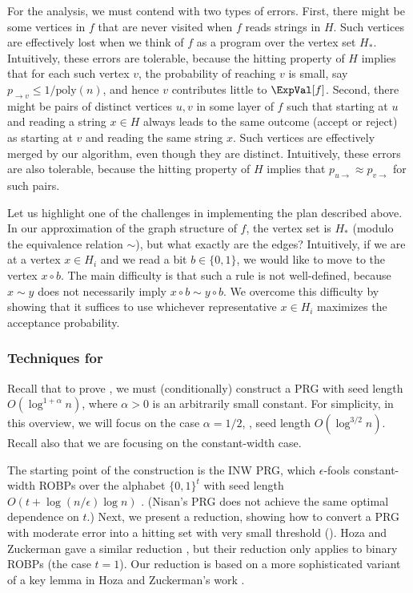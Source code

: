 For the analysis, we must contend with two types of errors. First, there might be some vertices in $f$ that are never visited when $f$ reads strings in $H$. Such vertices are effectively lost when we think of $f$ as a program over the vertex set $H_*$. Intuitively, these errors are tolerable, because the hitting property of $H$ implies that for each such vertex $v$, the probability of reaching $v$ is small, say $p_{\to v} \leq 1/\text{poly}(n)$, and hence $v$ contributes little to $\ExpVal[f]$. Second, there might be pairs of distinct vertices $u, v$ in some layer of $f$ such that starting at $u$ and reading a string $x \in H$ always leads to the same outcome (accept or reject) as starting at $v$ and reading the same string $x$. Such vertices are effectively merged by our algorithm, even though they are distinct. Intuitively, these errors are also tolerable, because the hitting property of $H$ implies that $p_{u \to} \approx p_{v \to}$ for such pairs.

Let us highlight one of the challenges in implementing the plan described above. In our approximation of the graph structure of $f$, the vertex set is $H_*$ (modulo the equivalence relation $\sim$), but what exactly are the edges? Intuitively, if we are at a vertex $x \in H_i$ and we read a bit $b \in \{0, 1\}$, we would like to move to the vertex $x \circ b$. The main difficulty is that such a rule is not well-defined, because $x \sim y$ does not necessarily imply $x \circ b \sim y \circ b$. We overcome this difficulty by showing that it suffices to use whichever representative $x \in H_i$ maximizes the acceptance probability.

\subsubsection{Techniques for } \label{sec:negative-techniques}

Recall that to prove , we must (conditionally) construct a PRG with seed length $O(\log^{1 + \alpha} n)$, where $\alpha > 0$ is an arbitrarily small constant. For simplicity, in this overview, we will focus on the case $\alpha = 1/2$, \ie, seed length $O(\log^{3/2} n)$. Recall also that we are focusing on the constant-width case. 

The starting point of the construction is the INW PRG, which $\epsilon$-fools constant-width ROBPs over the alphabet $\{0, 1\}^t$ with seed length $O(t + \log(n/\epsilon) \log n)$ \cite{INW94}. (Nisan's PRG \cite{Nis92} does not achieve the same optimal dependence on $t$.) Next, we present a reduction, showing how to convert a PRG with moderate error into a hitting set with very small threshold (). Hoza and Zuckerman gave a similar reduction \cite{HZ20}, but their reduction only applies to binary ROBPs (the case $t = 1$). Our reduction is based on a more sophisticated variant of a key lemma in Hoza and Zuckerman's work \cite{HZ20}.

